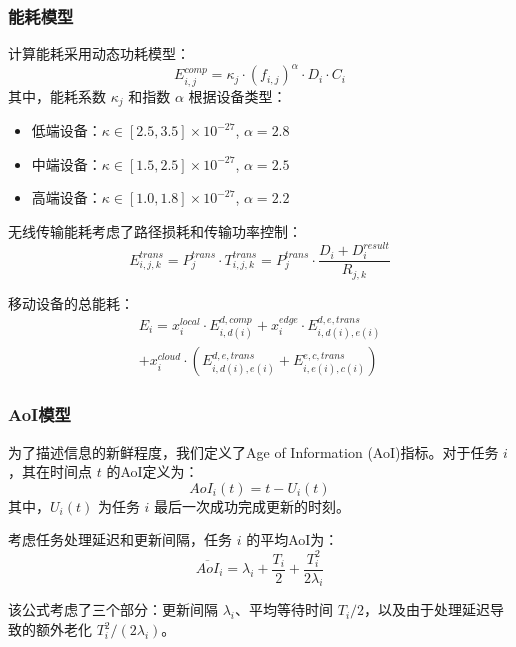 \documentclass[conference]{IEEEtran}
\begin{document}
\subsubsection{能耗模型}
计算能耗采用动态功耗模型：
\begin{equation}
E_{i,j}^{comp} = \kappa_j \cdot (f_{i,j})^{\alpha} \cdot D_i \cdot C_i
\end{equation}
其中，能耗系数 $\kappa_j$ 和指数 $\alpha$ 根据设备类型：
\begin{itemize}
    \item 低端设备：$\kappa \in [2.5, 3.5] \times 10^{-27}$, $\alpha = 2.8$
    \item 中端设备：$\kappa \in [1.5, 2.5] \times 10^{-27}$, $\alpha = 2.5$
    \item 高端设备：$\kappa \in [1.0, 1.8] \times 10^{-27}$, $\alpha = 2.2$
\end{itemize}

无线传输能耗考虑了路径损耗和传输功率控制：
\begin{equation}
E_{i,j,k}^{trans} = P_j^{trans} \cdot T_{i,j,k}^{trans} = P_j^{trans} \cdot \frac{D_i + D_i^{result}}{R_{j,k}}
\end{equation}

移动设备的总能耗：
\begin{equation}
\begin{split}
E_i = x_{i}^{local} \cdot E_{i,d(i)}^{d,comp} + x_{i}^{edge} \cdot E_{i,d(i),e(i)}^{d,e,trans} \\
+ x_{i}^{cloud} \cdot (E_{i,d(i),e(i)}^{d,e,trans} + E_{i,e(i),c(i)}^{e,c,trans})
\end{split}
\end{equation}

\subsubsection{AoI模型}
为了描述信息的新鲜程度，我们定义了Age of Information (AoI)指标。对于任务 $i$，其在时间点 $t$ 的AoI定义为：
\begin{equation}
AoI_i(t) = t - U_i(t)
\end{equation}
其中，$U_i(t)$ 为任务 $i$ 最后一次成功完成更新的时刻。

考虑任务处理延迟和更新间隔，任务 $i$ 的平均AoI为：
\begin{equation}
\overline{AoI}_i = \lambda_i + \frac{T_i}{2} + \frac{T_i^2}{2\lambda_i}
\end{equation}

该公式考虑了三个部分：更新间隔 $\lambda_i$、平均等待时间 $T_i/2$，以及由于处理延迟导致的额外老化 $T_i^2/(2\lambda_i)$。
\end{document}
